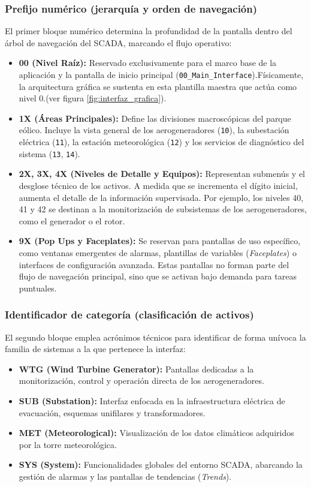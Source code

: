 \subsubsection{Prefijo numérico (jerarquía y orden de navegación)}
El primer bloque numérico determina la profundidad de la pantalla dentro del árbol de navegación del SCADA, marcando el flujo operativo:
\begin{itemize}
    \item \textbf{00 (Nivel Raíz):} Reservado exclusivamente para el marco base de la aplicación y la pantalla de inicio principal (\texttt{00\_Main\_Interface}).Físicamente, la arquitectura gráfica se sustenta en esta plantilla maestra que actúa como nivel 0.(ver figura \ref{fig:interfaz_grafica}).
    \item \textbf{1X (Áreas Principales):} Define las divisiones macroscópicas del parque eólico. Incluye la vista general de los aerogeneradores (\texttt{10}), la subestación eléctrica (\texttt{11}), la estación meteorológica (\texttt{12}) y los servicios de diagnóstico del sistema (\texttt{13}, \texttt{14}).
    \item \textbf{2X, 3X, 4X (Niveles de Detalle y Equipos):} Representan submenús y el desglose técnico de los activos. A medida que se incrementa el dígito inicial, aumenta el detalle de la información supervisada. Por ejemplo, los niveles 40, 41 y 42 se destinan a la monitorización de subsistemas de los aerogeneradores, como el generador o el rotor.
    \item \textbf{9X (Pop Ups y Faceplates):} Se reservan para pantallas de uso específico, como ventanas emergentes de alarmas, plantillas de variables (\textit{Faceplates}) o interfaces de configuración avanzada. Estas pantallas no forman parte del flujo de navegación principal, sino que se activan bajo demanda para tareas puntuales.
\end{itemize}

\subsubsection{Identificador de categoría (clasificación de activos)}
El segundo bloque emplea acrónimos técnicos para identificar de forma unívoca la familia de sistemas a la que pertenece la interfaz:
\begin{itemize}
    \item \textbf{\ac{WTG} (Wind Turbine Generator):} Pantallas dedicadas a la monitorización, control y operación directa de los aerogeneradores.
    \item \textbf{\ac{SUB} (Substation):} Interfaz enfocada en la infraestructura eléctrica de evacuación, esquemas unifilares y transformadores.
    \item \textbf{\ac{MET} (Meteorological):} Visualización de los datos climáticos adquiridos por la torre meteorológica.
    \item \textbf{\ac{SYS} (System):} Funcionalidades globales del entorno SCADA, abarcando la gestión de alarmas y las pantallas de tendencias (\textit{Trends}).
\end{itemize}

